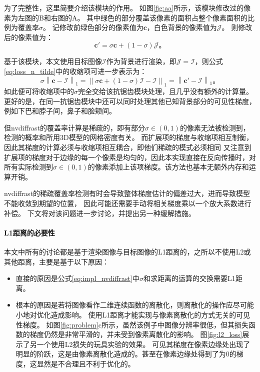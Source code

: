 为了完整性，这里简要介绍该模块的作用。
如图\ref{fig:aa}所示，该模块修改过的像素为左图的B和右图的A。
其中绿色的部分覆盖该像素的面积占整个像素面积的比例为覆盖率$\sigma$。
记修改前绿色部分的像素值为$\mathbf{c}$，白色背景的像素值为$\mathcal{J}$。
则修改后的像素值为：
\begin{equation}
\mathbf{c}' = \sigma\mathbf{c} + (1-\sigma)\mathcal{J}
\text{。}
\end{equation}

基于该模块，本文使用目标图像$\mathcal{I}$作为背景进行渲染，即$\mathcal{J}=\mathcal{I}$，则公式\ref{eq:loss_n_tilde}中的收缩项可进一步表示为：
\begin{equation}
\sigma\left\| \mathbf{c} - \mathcal{I} \right\|_1 =
\left\| \sigma\mathbf{c} + (1-\sigma)\mathcal{I} - \mathcal{I} \right\|_1 =
\left\| \mathbf{c}' - \mathcal{I} \right\|_1
\text{。}
\label{eq:impl_nvdiffrast}
\end{equation}
如此便可将收缩项中的$\sigma$完全交给该抗锯齿模块处理，且几乎没有额外的计算量。
更好的是，在同一抗锯齿模块中还可以同时处理其他已知背景部分的可见性梯度，例如下巴和脖子间，鼻子和脸颊间。

但nvdiffrast的覆盖率计算是稀疏的，即有部分$\sigma\in(0,1)$的像素无法被检测到，检测的概率和所用3D模型的网格密度有关。
而扩展项的梯度与收缩项相互制衡，因此其梯度的计算必须与收缩项相互耦合，即他们稀疏的模式必须相同
又注意到扩展项的梯度对于边缘的每一个像素是均匀的，因此本实现直接在反向传播时，对所有实际检测到$\sigma\in(0,1)$的像素添加上该项梯度。该方法也基本无额外内存和运算开销。

nvdiffrast的稀疏覆盖率检测有时会导致整体梯度估计的偏差过大，进而导致模型不能收敛到期望的位置，
因此可能还需要手动将相关梯度乘以一个放大系数进行补偿。
下文将对该问题进一步讨论，并提出另一种缓解措施。

\paragraph{L1距离的必要性}
本文中所有的讨论都是基于渲染图像与目标图像的L1距离的，之所以不使用L2或其他距离，主要是基于以下原因：
\begin{itemize}
\item 直接的原因是公式\ref{eq:impl_nvdiffrast}中$\sigma$和求距离的运算的交换需要L1距离。
\item 根本的原因是若将图像看作二维连续函数的离散化，则离散化的操作应尽可能小地对优化造成影响。
使用L1距离才能实现与像素离散化的方式无关的可见性梯度。
如图\ref{fig:problem}c所示，虽然该例子中图像分辨率很低，但其损失函数的梯度仍然是非常平滑的，并未受到像素离散化的影响。
图\ref{fig:l2_loss}展示了另一个使用L2损失的玩具实验的效果。
可见其梯度在像素边缘处出现了明显的阶跃，这是由像素离散化造成的。甚至在像素边缘处得到了为0的梯度，这显然是不合理且不利于优化的。
\end{itemize}

